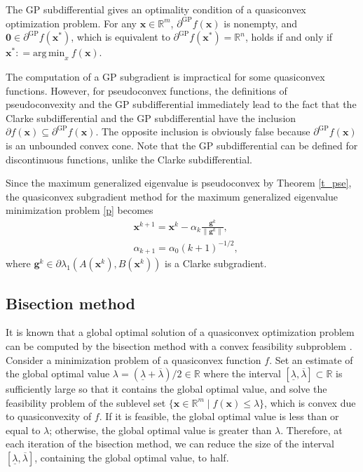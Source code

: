 \documentclass[sn-mathphys,Numbered]{sn-jnl}%
\theoremstyle{thmstyleone}%
\theoremstyle{thmstyletwo}%
\theoremstyle{thmstylethree}%
\def\coloneq{\mathrel{\mathop:}=}
\def\rn{\mathbb{R}^n}
\def\rm{\mathbb{R}^m}
\def\cpartial{\partial}
\def\gpartial{\partial^\mathrm{GP}}
\begin{document}
\begin{appendices}
The GP subdifferential gives an optimality condition of a quasiconvex optimization problem. For any $\bm{x}\in\rm$, $\gpartial f(\bm{x})$ is nonempty, and $\bm{0}\in\gpartial f(\bm{x}^*)$, which is equivalent to $\gpartial f(\bm{x}^*)=\rn$, holds if and only if $\bm{x}^*\coloneq \mathrm{arg\,min}_x\ f(\bm{x})$.

The computation of a GP subgradient is impractical for some quasiconvex functions. However, for pseudoconvex functions, the definitions of pseudoconvexity and the GP subdifferential immediately lead to the fact that the Clarke subdifferential and the GP subdifferential have the inclusion $\cpartial f(\bm{x})\subseteq\gpartial f(\bm{x})$. The opposite inclusion is obviously false because $\gpartial f(\bm{x})$ is an unbounded convex cone. Note that the GP subdifferential can be defined for discontinuous functions, unlike the Clarke subdifferential.

Since the maximum generalized eigenvalue is pseudoconvex by Theorem \ref{t_pse}, the quasiconvex subgradient method \cite{kiwiel01,konnov03,hu15} for the maximum generalized eigenvalue minimization problem \eqref{p} becomes 
\begin{align}
& \bm{x}^{k+1}=\bm{x}^k-\alpha_k\frac{\bm{g}^k}{\|\bm{g}^k\|},\\
& \alpha_{k+1} = \alpha_0(k+1)^{-1/2},
\end{align}
where $\bm{g}^k\in\cpartial\lambda_1(A(\bm{x}^k),B(\bm{x}^k))$ is a Clarke subgradient.

\subsection{Bisection method}
\label{a_bis}

It is known that a global optimal solution of a quasiconvex optimization problem can be computed by the bisection method with a convex feasibility subproblem \cite{boyd04}. Consider a minimization problem of a quasiconvex function $f$. Set an estimate of the global optimal value $\lambda=(\underline{\lambda}+\overline{\lambda})/2\in\mathbb{R}$ where the interval $[\underline{\lambda},\overline{\lambda}]\subset\mathbb{R}$ is sufficiently large so that it contains the global optimal value, and solve the feasibility problem of the sublevel set $\{\bm{x}\in\rm\mid f(\bm{x})\le\lambda\}$, which is convex due to quasiconvexity of $f$. If it is feasible, the global optimal value is less than or equal to $\lambda$; otherwise, the global optimal value is greater than $\lambda$. Therefore, at each iteration of the bisection method, we can reduce the size of the interval $[\underline{\lambda},\overline{\lambda}]$, containing the global optimal value, to half.


\end{appendices}
\end{document}
